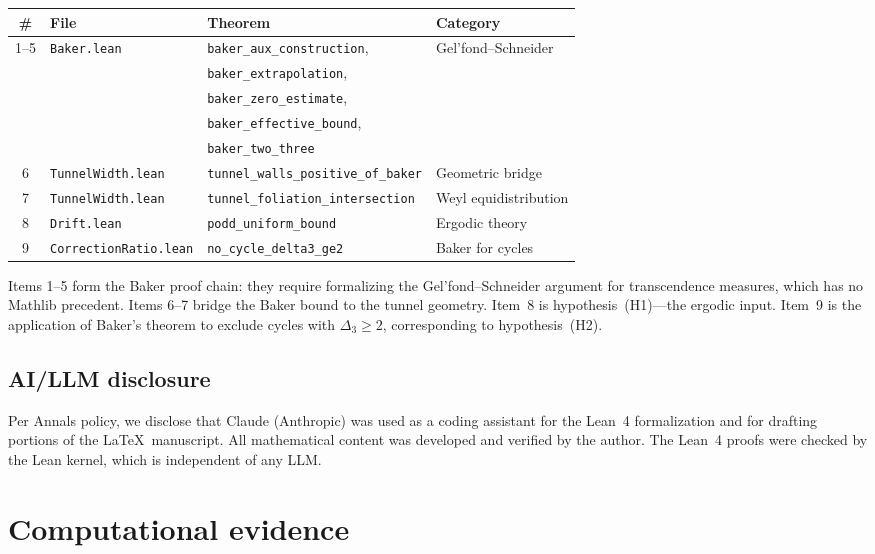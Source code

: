 \documentclass[manuscript]{aomart}
\theoremstyle{plain}
\theoremstyle{definition}
\theoremstyle{remark}
\numberwithin{equation}{section}
\begin{document}
\begin{center}
\renewcommand{\arraystretch}{1.3}
\begin{tabular}{clll}
  \toprule
  \textbf{\#} & \textbf{File} & \textbf{Theorem} & \textbf{Category} \\
  \midrule
  1--5 & \texttt{Baker.lean} &
    \texttt{baker\_aux\_construction}, &
    Gel'fond--Schneider \\
  & & \texttt{baker\_extrapolation}, & \\
  & & \texttt{baker\_zero\_estimate}, & \\
  & & \texttt{baker\_effective\_bound}, & \\
  & & \texttt{baker\_two\_three} & \\
  6 & \texttt{TunnelWidth.lean} &
    \texttt{tunnel\_walls\_positive\_of\_baker} &
    Geometric bridge \\
  7 & \texttt{TunnelWidth.lean} &
    \texttt{tunnel\_foliation\_intersection} &
    Weyl equidistribution \\
  8 & \texttt{Drift.lean} &
    \texttt{podd\_uniform\_bound} &
    Ergodic theory \\
  9 & \texttt{CorrectionRatio.lean} &
    \texttt{no\_cycle\_delta3\_ge2} &
    Baker for cycles \\
  \bottomrule
\end{tabular}
\end{center}

Items 1--5 form the Baker proof chain: they require formalizing the
Gel'fond--Schneider argument for transcendence measures, which has no
Mathlib precedent.  Items 6--7 bridge the Baker bound to the tunnel
geometry.  Item~8 is hypothesis~(H1)---the ergodic input.  Item~9 is
the application of Baker's theorem to exclude cycles with
$\Delta_3 \ge 2$, corresponding to hypothesis~(H2).

\subsection{AI/LLM disclosure}

Per Annals policy, we disclose that Claude (Anthropic) was used as a
coding assistant for the Lean~4 formalization and for drafting
portions of the \LaTeX\ manuscript.  All mathematical content was
developed and verified by the author.  The Lean~4 proofs were checked
by the Lean kernel, which is independent of any LLM.

\section{Computational evidence}\label{sec:computation}
\end{document}
